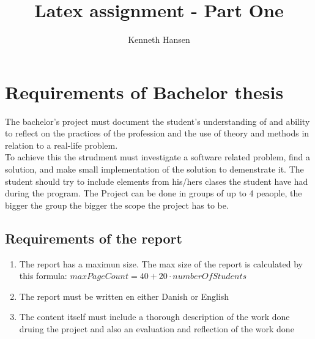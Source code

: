 \documentclass{article}
\author{Kenneth Hansen}
\title{Latex assignment - Part One}
\begin{document}
\maketitle

\section{Requirements of Bachelor thesis}
The bachelor’s project must document the student’s understanding of and ability to reflect on the practices of the profession and the use of theory and methods in relation to a real-life problem.
\cite[pg.18]{studieordning} \\
To achieve this the strudment must investigate a software related problem, find a solution, and make small implementation of the solution to demenstrate it. The student should try to include elements from his/hers clases the student have had during the program. The Project can be done in groups of up to 4 peaople, the bigger the group the bigger the scope the project has to be. 
\cite[pg.1]{bachelorProject} \\
\subsection{Requirements of the report}
\begin{enumerate}
    \item The report has a maximun size. The max size of the report is calculated by this formula: \(maxPageCount = 40 + 20·numberOfStudents\) \cite[pg.1]{studieordning}
    \item The report must be written en either Danish or English \cite[pg.1]{bachelorProject}
    \item The content itself must include a thorough description of the work done druing the project and also an evaluation and reflection of the work done \cite[pg.2]{studieordning}
  \end{enumerate}
\end{document}
